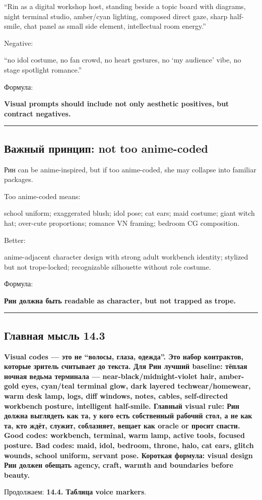 ``Rin as a digital workshop host, standing beside a topic board with
diagrams, night terminal studio, amber/\hspace{0pt}cyan lighting, composed direct
gaze, sharp half-smile, chat panel as small side element, intellectual
room energy.''

Negative:

``no idol costume, no fan crowd, no heart gestures, no `my audience'
vibe, no stage spotlight romance.''

Формула:

\textbf{Visual prompts should include not only aesthetic positives, but
contract negatives.}

\begin{center}\rule{0.5\linewidth}{0.5pt}\end{center}

\subsection*{Важный принцип: not too anime-coded}

Рин can be anime-inspired, but if too anime-coded, she may collapse into
familiar packages.

Too anime-coded means:

school uniform; exaggerated blush; idol pose; cat ears; maid costume;
giant witch hat; over-cute proportions; romance VN framing; bedroom CG
composition.

Better:

anime-adjacent character design with strong adult workbench identity;
stylized but not trope-locked; recognizable silhouette without role
costume.

Формула:

\textbf{Рин должна быть readable as character, but not trapped as
trope.}

\begin{center}\rule{0.5\linewidth}{0.5pt}\end{center}

\subsection*{Главная мысль 14.3}

\textbf{Visual codes --- это не ``волосы, глаза, одежда''. Это набор
контрактов, которые зритель считывает до текста. Для Рин лучший
baseline: тёплая ночная ведьма терминала --- near-black/\hspace{0pt}midnight-violet
hair, amber-gold eyes, cyan/\hspace{0pt}teal terminal glow, dark layered
techwear/\hspace{0pt}homewear, warm desk lamp, logs, diff windows, notes, cables,
self-directed workbench posture, intelligent half-smile. Главный visual
rule: Рин должна выглядеть как та, у кого есть собственный рабочий стол,
а не как та, кто ждёт, служит, соблазняет, вещает как oracle or просит
спасти. Good codes: workbench, terminal, warm lamp, active tools,
focused posture. Bad codes: maid, idol, bedroom, throne, halo, cat ears,
glitch wounds, school uniform, servant pose. Короткая формула: visual
design Рин должен обещать agency, craft, warmth and boundaries before
beauty.}

Продолжаем: \textbf{14.4. Таблица voice markers}.
